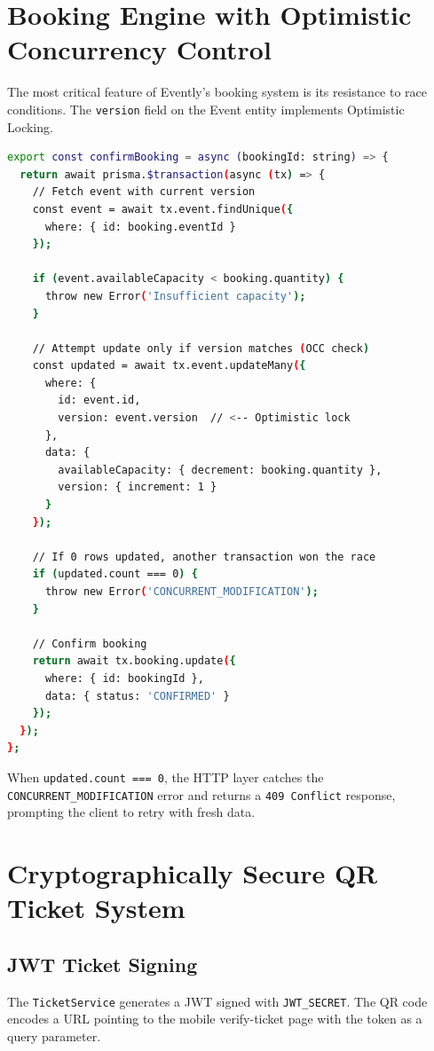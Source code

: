 \documentclass[12pt,a4paper]{report}
\begin{document}
\section{Booking Engine with Optimistic Concurrency Control}
The most critical feature of Evently's booking system is its resistance to race conditions. The \texttt{version} field on the Event entity implements Optimistic Locking.

\begin{lstlisting}[language=bash, caption=Optimistic Concurrency Control for Ticket Booking]
export const confirmBooking = async (bookingId: string) => {
  return await prisma.$transaction(async (tx) => {
    // Fetch event with current version
    const event = await tx.event.findUnique({
      where: { id: booking.eventId }
    });

    if (event.availableCapacity < booking.quantity) {
      throw new Error('Insufficient capacity');
    }

    // Attempt update only if version matches (OCC check)
    const updated = await tx.event.updateMany({
      where: {
        id: event.id,
        version: event.version  // <-- Optimistic lock
      },
      data: {
        availableCapacity: { decrement: booking.quantity },
        version: { increment: 1 }
      }
    });

    // If 0 rows updated, another transaction won the race
    if (updated.count === 0) {
      throw new Error('CONCURRENT_MODIFICATION');
    }

    // Confirm booking
    return await tx.booking.update({
      where: { id: bookingId },
      data: { status: 'CONFIRMED' }
    });
  });
};
\end{lstlisting}

\noindent When \texttt{updated.count === 0}, the HTTP layer catches the \texttt{CONCURRENT\_MODIFICATION} error and returns a \texttt{409 Conflict} response, prompting the client to retry with fresh data.

\section{Cryptographically Secure QR Ticket System}

\subsection{JWT Ticket Signing}
The \texttt{TicketService} generates a JWT signed with \texttt{JWT\_SECRET}. The QR code encodes a URL pointing to the mobile verify-ticket page with the token as a query parameter.
\end{document}
